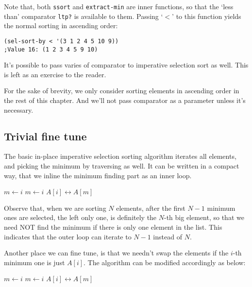 \documentclass{article}
\begin{document}
Note that, both \verb|ssort| and \verb|extract-min| are inner functions, so that the
`less than' comparator \verb|ltp?| is available to them. Passing `$<$' to this function
yields the normal sorting in ascending order:

\lstset{language=Lisp}
\begin{lstlisting}
(sel-sort-by < '(3 1 2 4 5 10 9))
;Value 16: (1 2 3 4 5 9 10)
\end{lstlisting}

It's possible to pass varies of comparator to imperative selection sort as well. This
is left as an exercise to the reader.

For the sake of brevity, we only consider sorting elements in ascending order in
the rest of this chapter. And we'll not pass comparator as a parameter unless it's
necessary.

\subsection{Trivial fine tune}

The basic in-place imperative selection sorting algorithm iterates all elements, and picking the
minimum by traversing as well. It can be written in a compact way, that we
inline the minimum finding part as an inner loop.

\begin{algorithmic}
    \State $m \gets i$
        \State $m \gets i$
      \EndIf
    \EndFor
    \State {} $A[i] \leftrightarrow A[m]$
  \EndFor
\EndProcedure
\end{algorithmic}

Observe that, when we are sorting $N$ elements, after the first $N-1$ minimum ones are selected,
the left only one, is definitely the $N$-th big element, so that we need NOT find the
minimum if there is only one element in the list. This indicates that the outer loop can
iterate to $N-1$ instead of $N$.

Another place we can fine tune, is that we needn't swap the elements if the $i$-th minimum one
is just $A[i]$. The algorithm can be modified accordingly as below:

\begin{algorithmic}
    \State $m \gets i$
        \State $m \gets i$
      \EndIf
    \EndFor
      \State {} $A[i] \leftrightarrow A[m]$
    \EndIf
  \EndFor
\EndProcedure
\end{algorithmic}
\end{document}
